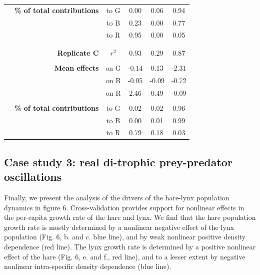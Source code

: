 \documentclass[11pt, oneside]{article}
\begin{document}
\begin{table}[H]
\begin{center}
\begin{tabular}{rrcccc}
	& \textbf{\% of total contributions} 
    &   to G &  0.00 &  0.06 &  0.94 \\ 
    & & to B &  0.23 &  0.00 &  0.77 \\
    & & to R &  0.95 &  0.00 &  0.05 \\
	& \\
	\hline
	& \\
    & \textbf{Replicate C} & $r^2$  &  0.93 & 0.29 & 0.87 \\
	& \\
	& \textbf{Mean effects} 
    &   on G & -0.14 &  0.13 & -2.31 \\
    & & on B & -0.05 & -0.09 & -0.72 \\
    & & on R &  2.46 &  0.49 & -0.09 \\
	& \\
	& \textbf{\% of total contributions} 
    &   to G &  0.02 &  0.02 &  0.96 \\
    & & to B &  0.00 &  0.01 &  0.99 \\
    & & to R &  0.79 &  0.18 &  0.03 \\
\end{tabular}
\end{center}
\end{table}
\newpage

\subsection{Case study 3: real di-trophic prey-predator oscillations}

Finally, we present the analysis of the drivers of the hare-lynx population dynamics in figure 6.
Cross-validation provides support for nonlinear effects in the per-capita growth rate of the hare and lynx.
We find that the hare population growth rate is mostly determined by a nonlinear negative effect of the lynx population (Fig. 6, b. and c. blue line), and by weak nonlinear positive density dependence (red line). 
The lynx growth rate is determined by a positive nonlinear effect of the hare (Fig. 6, e. and f., red line), and to a lesser extent by negative nonlinear intra-specific density dependence (blue line).
\end{document}
